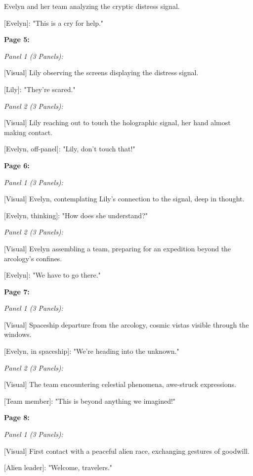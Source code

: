 \begin{aquote}
    [Visual] Evelyn and her team analyzing the cryptic distress signal.

    [Evelyn]: "This is a cry for help."\medskip

    \noindent\textbf{Page 5:}\smallskip

    \noindent\emph{Panel 1 (3 Panels):}

    [Visual] Lily observing the screens displaying the distress signal.

    [Lily]: "They're scared."\smallskip

    \noindent\emph{Panel 2 (3 Panels):}

    [Visual] Lily reaching out to touch the holographic signal, her hand almost making contact.

    [Evelyn, off-panel]: "Lily, don't touch that!"\medskip

    \noindent\textbf{Page 6:}\smallskip

    \noindent\emph{Panel 1 (3 Panels):}

    [Visual] Evelyn, contemplating Lily's connection to the signal, deep in thought.

    [Evelyn, thinking]: "How does she understand?"\smallskip

    \noindent\emph{Panel 2 (3 Panels):}

    [Visual] Evelyn assembling a team, preparing for an expedition beyond the arcology's confines.

    [Evelyn]: "We have to go there."\medskip

    \noindent\textbf{Page 7:}\smallskip

    \noindent\emph{Panel 1 (3 Panels):}

    [Visual] Spaceship departure from the arcology, cosmic vistas visible through the windows.

    [Evelyn, in spaceship]: "We're heading into the unknown."\smallskip

    \noindent\emph{Panel 2 (3 Panels):}

    [Visual] The team encountering celestial phenomena, awe-struck expressions.

    [Team member]: "This is beyond anything we imagined!"\medskip

    \noindent\textbf{Page 8:}\smallskip

    \noindent\emph{Panel 1 (3 Panels):}

    [Visual] First contact with a peaceful alien race, exchanging gestures of goodwill.

    [Alien leader]: "Welcome, travelers."\smallskip


\end{aquote}
